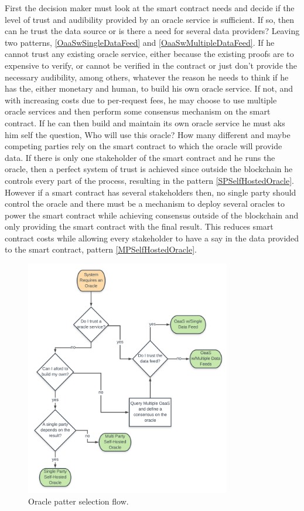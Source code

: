 First the decision maker must look at the smart contract needs and decide if the level of trust and audibility provided by an oracle service is sufficient. If so, then can he trust the data source or is there a need for several data providers? Leaving two patterns, \ref{OaaSwSingleDataFeed} and \ref{OaaSwMultipleDataFeed}.
If he cannot trust any existing oracle service, either because the existing proofs are to expensive to verify, or cannot be verified in the contract or just don't provide the necessary audibility, among others, whatever the reason he needs to think if he has the, either monetary and human, to build his own oracle service. If not, and with increasing costs due to per-request fees, he may choose to use multiple oracle services and then perform some consensus mechanism on the smart contract. If he can then build and maintain its own oracle service he must aks him self the question, Who will use this oracle? How many different and maybe competing parties rely on the smart contract to which the oracle will provide data. If there is only one stakeholder of the smart contract and he runs the oracle, then a perfect system of trust is achieved since outside the blockchain he controls every part of the process, resulting in the pattern \ref{SPSelfHostedOracle}. However if a smart contract has several stakeholders then, no single party should control the oracle and there must be a mechanism to deploy several oracles to power the smart contract while achieving consensus outside of the blockchain and only providing the smart contract with the final result. This reduces smart contract costs while allowing every stakeholder to have a say in the data provided to the smart contract, pattern \ref{MPSelfHostedOracle}.

\begin{figure}[t]
  \begin{center}
    \leavevmode
    \includegraphics[width=0.8\textwidth]{figures/oracle-pattern-flow.png}
    \caption{Oracle patter selection flow.}
    \label{fig:/figures/oracle-pattern-flow}
  \end{center}
\end{figure}


